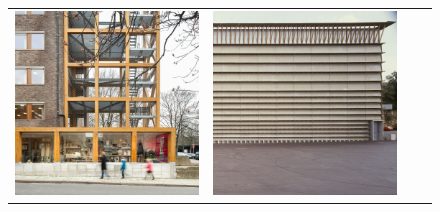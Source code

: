 \begin{figure}[H]
{\begin{tabular}{@{}cccc@{}}
      \includegraphics[width=\linewidth]{Images/LoRAs/Modulariteit/10.jpg}&
      \includegraphics[width=\linewidth]{Images/LoRAs/Modulariteit/12.jpeg}&

\end{tabular}}
\end{figure}
